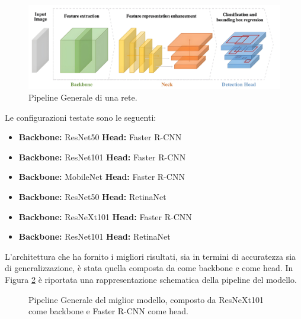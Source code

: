 \documentclass[minted, draw]{../tex/hebdomon}
\begin{document}
%
\begin{figure}[H]
  \centering
  \includegraphics[width=\linewidth]{figures/general_pipeline.png}
  \caption{Pipeline Generale di una rete.}
  \label{fig:general_pipeline}
\end{figure}
%

Le configurazioni testate sono le seguenti:
\begin{itemize}
    \item \textbf{Backbone:} ResNet50 \quad \textbf{Head:} Faster R-CNN
    \item \textbf{Backbone:} ResNet101 \quad \textbf{Head:} Faster R-CNN
    \item \textbf{Backbone:} MobileNet \quad \textbf{Head:} Faster R-CNN
    \item \textbf{Backbone:} ResNet50 \quad \textbf{Head:} RetinaNet
    \item \textbf{Backbone:} ResNeXt101 \quad \textbf{Head:} Faster R-CNN
    \item \textbf{Backbone:} ResNet101 \quad \textbf{Head:} RetinaNet
\end{itemize}

L’architettura che ha fornito i migliori risultati, sia in termini di accuratezza sia di generalizzazione, è stata quella composta da  come backbone e  come head. In Figura \ref{fig:model_best} è riportata una rappresentazione schematica della pipeline del modello.



%
\begin{figure}[ht]
	\centering
	
	\caption{Pipeline Generale del miglior modello, composto da ResNeXt101 come backbone e Faster R-CNN come head.}
	\label{fig:model_best}
\end{figure}
%



\end{document}
